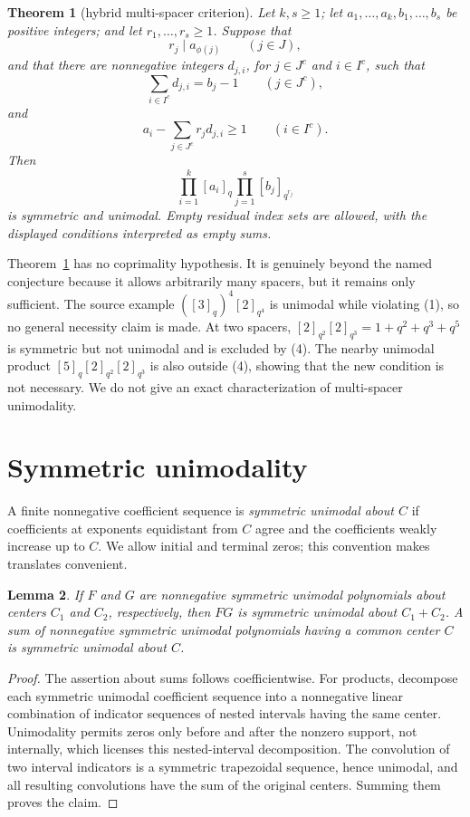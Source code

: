 \documentclass[11pt]{article}
\newtheorem{theorem}{Theorem}
\newtheorem{lemma}[theorem]{Lemma}
\begin{document}
\begin{theorem}[hybrid multi-spacer criterion]\label{thm:hybrid}
Let \(k,s\geq1\); let \(a_1,\ldots,a_k,b_1,\ldots,b_s\) be positive
integers; and let \(r_1,\ldots,r_s\geq1\).  Suppose that
\[
 r_j\mid a_{\phi(j)}\qquad(j\in J),
\]
and that there are nonnegative integers \(d_{j,i}\), for
\(j\in J^c\) and \(i\in I^c\), such that
\[
 \sum_{i\in I^c}d_{j,i}=b_j-1\qquad(j\in J^c),       \tag{3}
\]
and
\[
 a_i-\sum_{j\in J^c}r_jd_{j,i}\geq1
 \qquad(i\in I^c).                                  \tag{4}
\]
Then
\[
 \prod_{i=1}^k[a_i]_q\prod_{j=1}^s[b_j]_{q^{r_j}}
\]
is symmetric and unimodal.  Empty residual index sets are allowed, with
the displayed conditions interpreted as empty sums.
\end{theorem}

Theorem~\ref{thm:hybrid} has no coprimality hypothesis.  It is genuinely
beyond the named conjecture because it allows arbitrarily many spacers, but
it remains only sufficient.  The source example
\(([3]_q)^4[2]_{q^4}\) is unimodal while violating (1), so no general
necessity claim is made.  At two spacers,
\([2]_{q^2}[2]_{q^3}=1+q^2+q^3+q^5\) is symmetric but not unimodal and is
excluded by (4).  The nearby unimodal product
\([5]_q[2]_{q^2}[2]_{q^3}\) is also outside (4), showing that the new
condition is not necessary.  We do not give an exact characterization of
multi-spacer unimodality.

\section{Symmetric unimodality}

A finite nonnegative coefficient sequence is \emph{symmetric unimodal about
\(C\)} if coefficients at exponents equidistant from \(C\) agree and the
coefficients weakly increase up to \(C\).  We allow initial and terminal
zeros; this convention makes translates convenient.

\begin{lemma}\label{lem:closure}
If \(F\) and \(G\) are nonnegative symmetric unimodal polynomials about
centers \(C_1\) and \(C_2\), respectively, then \(FG\) is symmetric
unimodal about \(C_1+C_2\).  A sum of nonnegative symmetric unimodal
polynomials having a common center \(C\) is symmetric unimodal about \(C\).
\end{lemma}

\begin{proof}
The assertion about sums follows coefficientwise.  For products, decompose
each symmetric unimodal coefficient sequence into a nonnegative linear
combination of indicator sequences of nested intervals having the same
center.  Unimodality permits zeros only before and after the nonzero support,
not internally, which licenses this nested-interval decomposition.  The
convolution of two interval indicators is a symmetric
trapezoidal sequence, hence unimodal, and all resulting convolutions have
the sum of the original centers.  Summing them proves the claim.
\end{proof}
\end{document}
